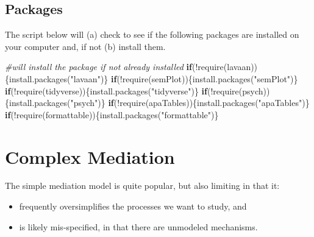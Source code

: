 \documentclass[
]{book}
\newenvironment{Shaded}{\begin{snugshade}}{\end{snugshade}}
\newcommand{\CommentTok}[1]{\textcolor[rgb]{0.56,0.35,0.01}{\textit{#1}}}
\newcommand{\ControlFlowTok}[1]{\textcolor[rgb]{0.13,0.29,0.53}{\textbf{#1}}}
\newcommand{\FunctionTok}[1]{\textcolor[rgb]{0.00,0.00,0.00}{#1}}
\newcommand{\NormalTok}[1]{#1}
\newcommand{\SpecialCharTok}[1]{\textcolor[rgb]{0.00,0.00,0.00}{#1}}
\newcommand{\StringTok}[1]{\textcolor[rgb]{0.31,0.60,0.02}{#1}}
\providecommand{\tightlist}{%
  \setlength{\itemsep}{0pt}\setlength{\parskip}{0pt}}
\begin{document}
\hypertarget{packages-6}{%
\subsection{Packages}\label{packages-6}}

The script below will (a) check to see if the following packages are installed on your computer and, if not (b) install them.

\begin{Shaded}
\begin{Highlighting}[]
\CommentTok{\#will install the package if not already installed}
\ControlFlowTok{if}\NormalTok{(}\SpecialCharTok{!}\FunctionTok{require}\NormalTok{(lavaan))\{}\FunctionTok{install.packages}\NormalTok{(}\StringTok{"lavaan"}\NormalTok{)\}}
\ControlFlowTok{if}\NormalTok{(}\SpecialCharTok{!}\FunctionTok{require}\NormalTok{(semPlot))\{}\FunctionTok{install.packages}\NormalTok{(}\StringTok{"semPlot"}\NormalTok{)\}}
\ControlFlowTok{if}\NormalTok{(}\SpecialCharTok{!}\FunctionTok{require}\NormalTok{(tidyverse))\{}\FunctionTok{install.packages}\NormalTok{(}\StringTok{"tidyverse"}\NormalTok{)\}}
\ControlFlowTok{if}\NormalTok{(}\SpecialCharTok{!}\FunctionTok{require}\NormalTok{(psych))\{}\FunctionTok{install.packages}\NormalTok{(}\StringTok{"psych"}\NormalTok{)\}}
\ControlFlowTok{if}\NormalTok{(}\SpecialCharTok{!}\FunctionTok{require}\NormalTok{(apaTables))\{}\FunctionTok{install.packages}\NormalTok{(}\StringTok{"apaTables"}\NormalTok{)\}}
\ControlFlowTok{if}\NormalTok{(}\SpecialCharTok{!}\FunctionTok{require}\NormalTok{(formattable))\{}\FunctionTok{install.packages}\NormalTok{(}\StringTok{"formattable"}\NormalTok{)\}}
\end{Highlighting}
\end{Shaded}

\hypertarget{complex-mediation}{%
\section{Complex Mediation}\label{complex-mediation}}

The simple mediation model is quite popular, but also limiting in that it:

\begin{itemize}
\tightlist
\item
  frequently oversimplifies the processes we want to study, and
\item
  is likely mis-specified, in that there are unmodeled mechanisms.
\end{itemize}
\end{document}
